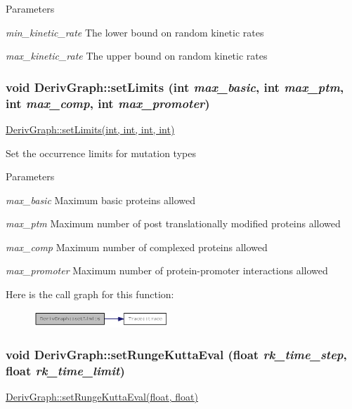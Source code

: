 \begin{DoxyParams}{Parameters}
\item[{\em min\_\-kinetic\_\-rate}]The lower bound on random kinetic rates \item[{\em max\_\-kinetic\_\-rate}]The upper bound on random kinetic rates \end{DoxyParams}
\hypertarget{classDerivGraph_a9bec1192a5ffc41a3ef4527caa9cdb8f}{
\subsubsection[{setLimits}]{\setlength{\rightskip}{0pt plus 5cm}void DerivGraph::setLimits (int {\em max\_\-basic}, \/  int {\em max\_\-ptm}, \/  int {\em max\_\-comp}, \/  int {\em max\_\-promoter})}}
\label{classDerivGraph_a9bec1192a5ffc41a3ef4527caa9cdb8f}
\hyperlink{classDerivGraph_a9bec1192a5ffc41a3ef4527caa9cdb8f}{DerivGraph::setLimits(int, int, int, int)}

Set the occurrence limits for mutation types


\begin{DoxyParams}{Parameters}
\item[{\em max\_\-basic}]Maximum basic proteins allowed \item[{\em max\_\-ptm}]Maximum number of post translationally modified proteins allowed \item[{\em max\_\-comp}]Maximum number of complexed proteins allowed \item[{\em max\_\-promoter}]Maximum number of protein-\/promoter interactions allowed \end{DoxyParams}


Here is the call graph for this function:\nopagebreak
\begin{figure}[H]
\begin{center}
\leavevmode
\includegraphics[width=144pt]{classDerivGraph_a9bec1192a5ffc41a3ef4527caa9cdb8f_cgraph}
\end{center}
\end{figure}
\hypertarget{classDerivGraph_a03b18e0508b383e7e6b3b57fc9fa6e90}{
\subsubsection[{setRungeKuttaEval}]{\setlength{\rightskip}{0pt plus 5cm}void DerivGraph::setRungeKuttaEval (float {\em rk\_\-time\_\-step}, \/  float {\em rk\_\-time\_\-limit})}}
\label{classDerivGraph_a03b18e0508b383e7e6b3b57fc9fa6e90}
\hyperlink{classDerivGraph_a03b18e0508b383e7e6b3b57fc9fa6e90}{DerivGraph::setRungeKuttaEval(float, float)}

